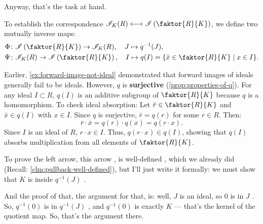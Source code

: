 \begin{proofWrapper}
\begin{speech}[00:22:05 - 00:23:35]
Anyway, that's the task at hand.
\end{speech}

\begin{content}
To establish the correspondence $\mathscr{I}_K(R) \longleftrightarrow \mathscr{I}\left(\faktor{R}{K}\right)$, we define two mutually inverse maps:
\begin{align}
\Phi &\colon \mathscr{I}\left(\faktor{R}{K}\right) \to \mathscr{I}_K(R), \quad J \mapsto q^{-1}(J), \label{eq:map-phi} \\
\Psi &\colon \mathscr{I}_K(R) \to \mathscr{I}\left(\faktor{R}{K}\right), \quad I \mapsto q(I) = \{ \bar{x} \in \faktor{R}{K} \mid x \in I \}. \label{eq:map-psi}
\end{align}

\begin{steps}
Earlier, \cref{ex:forward-image-not-ideal} demonstrated that forward images of ideals generally fail to be ideals. However, $q$ is \textbf{surjective} (\cref{prop:properties-of-q}).
For any ideal $I \subset R$, $q(I)$ is an additive subgroup of $\faktor{R}{K}$ because $q$ is a homomorphism. To check ideal absorption:
Let $\bar{r} \in \faktor{R}{K}$ and $\bar{x} \in q(I)$ with $x \in I$. Since $q$ is surjective, $\bar{r} = q(r)$ for some $r \in R$. Then:
\[
\bar{r} \cdot \bar{x} = q(r) \cdot q(x) = q(r \cdot x).
\]
Since $I$ is an ideal of $R$, $r \cdot x \in I$. Thus, $q(r \cdot x) \in q(I)$, showing that $q(I)$ absorbs multiplication from all elements of $\faktor{R}{K}$.
\end{steps}
\end{content}

\begin{speech}[00:23:35 - 00:25:06]
To prove the left arrow, this arrow , is well-defined , which we already did (Recall: \cref{clm:pullback-well-defined}), but I'll just write it formally: we must show that $K$ is inside $q^{-1}(J)$ .

And the proof of that, the argument for that, is: well, $J$ is an ideal, so $0$ is in $J$ . So, $q^{-1}(0)$ is in $q^{-1}(J)$ , and $q^{-1}(0)$ is exactly $K$  --- that's the kernel of the quotient map. So, that's the argument there.


\end{speech}
\end{proofWrapper}
